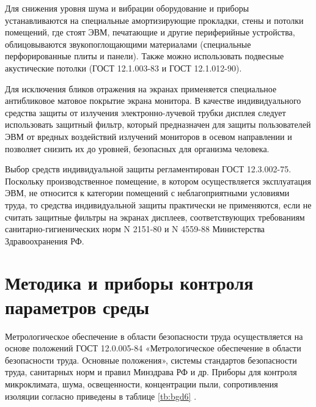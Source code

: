 \documentclass[12pt,a4paper]{report}
\begin{document}
Для снижения уровня шума и вибрации оборудование и приборы устанавливаются на специальные амортизирующие прокладки, стены и потолки помещений, где стоят ЭВМ, печатающие и другие периферийные устройства, облицовываются звукопоглощающими материалами (специальные перфорированные плиты и панели). Также можно использовать подвесные акустические потолки (ГОСТ 12.1.003-83 и ГОСТ 12.1.012-90).

Для исключения бликов отражения на экранах применяется специальное антибликовое матовое покрытие экрана монитора. В качестве индивидуального средства защиты от излучения электронно-лучевой трубки дисплея следует использовать защитный фильтр, который предназначен для защиты пользователей ЭВМ от вредных воздействий излучений мониторов в осевом направлении и позволяет снизить их до уровней, безопасных для организма человека.

Выбор средств индивидуальной защиты регламентирован ГОСТ 12.3.002-75. Поскольку производственное помещение, в котором осуществляется эксплуатация ЭВМ, не относится к категории помещений с неблагоприятными условиями труда, то средства индивидуальной защиты практически не применяются, если не считать защитные фильтры на экранах дисплеев, соответствующих требованиям санитарно-гигиенических норм N 2151-80 и N 4559-88 Министерства Здравоохранения РФ.

\section{Методика и приборы контроля параметров среды}

Метрологическое обеспечение в области безопасности труда осуществляется на основе положений ГОСТ 12.0.005-84 «Метрологическое обеспечение в области безопасности труда. Основные положения», системы стандартов безопасности труда, санитарных норм и правил Минздрава РФ и др.
Приборы для контроля микроклимата, шума, освещенности, концентрации пыли, сопротивления изоляции согласно приведены в таблице \ref{tb:bgd6} \cite{bgd20}.
\end{document}
